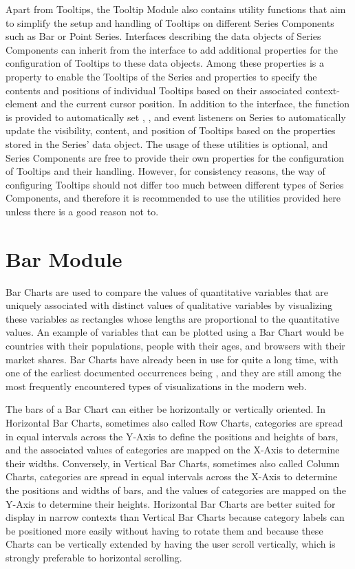 Apart from Tooltips, the Tooltip Module also contains utility functions that aim to simplify the setup and handling of Tooltips on different Series Components such as Bar or Point Series.
Interfaces describing the data objects of Series Components can inherit from the  interface to add additional properties for the configuration of Tooltips to these data objects. 
Among these properties is a property to enable the Tooltips of the Series and properties to specify the contents and positions of individual Tooltips based on their associated context-element and the current cursor position.
In addition to the  interface, the  function is provided to automatically set , , and  event listeners on Series to automatically update the visibility, content, and position of Tooltips based on the  properties stored in the Series' data object.
The usage of these utilities is optional, and Series Components are free to provide their own properties for the configuration of Tooltips and their handling.
However, for consistency reasons, the way of configuring Tooltips should not differ too much between different types of Series Components, and therefore it is recommended to use the utilities provided here unless there is a good reason not to.


\section{Bar Module}

Bar Charts are used to compare the values of quantitative variables that are uniquely associated with distinct values of qualitative variables by visualizing these variables as rectangles whose lengths are proportional to the quantitative values.
An example of variables that can be plotted using a Bar Chart would be countries with their populations, people with their ages, and browsers with their market shares.
Bar Charts have already been in use for quite a long time, with one of the earliest documented occurrences being \textcite{CommercialAndPoliticalAtlas}, and they are still among the most frequently encountered types of visualizations in the modern web.

The bars of a Bar Chart can either be horizontally or vertically oriented.
In Horizontal Bar Charts, sometimes also called Row Charts, categories are spread in equal intervals across the Y-Axis to define the positions and heights of bars, and the associated values of categories are mapped on the X-Axis to determine their widths. 
Conversely, in Vertical Bar Charts, sometimes also called Column Charts, categories are spread in equal intervals across the X-Axis to determine the positions and widths of bars, and the values of categories are mapped on the Y-Axis to determine their heights.
Horizontal Bar Charts are better suited for display in narrow contexts than Vertical Bar Charts because category labels can be positioned more easily without having to rotate them and because these Charts can be vertically extended by having the user scroll vertically, which is strongly preferable to horizontal scrolling. 


